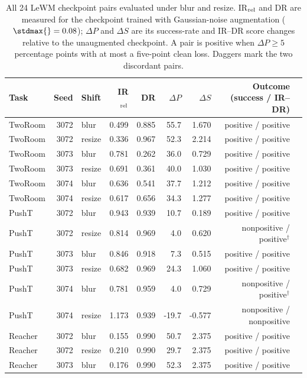 \begin{table}[t]
\centering
\caption{All 24 LeWM checkpoint pairs evaluated under blur and resize. IR$_{\rm rel}$ and DR are measured for the checkpoint trained with Gaussian-noise augmentation ($\stdmax{}=0.08$); $\Delta P$ and $\Delta S$ are its success-rate and IR--DR score changes relative to the unaugmented checkpoint. A pair is positive when $\Delta P\geq5$ percentage points with at most a five-point clean loss. Daggers mark the two discordant pairs.}
\label{tab:cross-stressor-ir-dr-all-pairs}
\footnotesize
\setlength{\tabcolsep}{3pt}
\begin{tabular}{lrlrrrrrl}
\toprule
Task & Seed & Shift & IR$_{\rm rel}$ & DR & $\Delta P$ & $\Delta S$ & Outcome (success / IR--DR) \\
\midrule
TwoRoom & 3072 & blur & 0.499 & 0.885 & 55.7 & 1.670 & positive / positive \\
TwoRoom & 3072 & resize & 0.336 & 0.967 & 52.3 & 2.214 & positive / positive \\
TwoRoom & 3073 & blur & 0.781 & 0.262 & 36.0 & 0.729 & positive / positive \\
TwoRoom & 3073 & resize & 0.691 & 0.361 & 40.0 & 1.030 & positive / positive \\
TwoRoom & 3074 & blur & 0.636 & 0.541 & 37.7 & 1.212 & positive / positive \\
TwoRoom & 3074 & resize & 0.617 & 0.656 & 34.3 & 1.277 & positive / positive \\
PushT & 3072 & blur & 0.943 & 0.939 & 10.7 & 0.189 & positive / positive \\
PushT & 3072 & resize & 0.814 & 0.969 & 4.0 & 0.620 & nonpositive / positive$^\dag$ \\
PushT & 3073 & blur & 0.846 & 0.918 & 7.3 & 0.515 & positive / positive \\
PushT & 3073 & resize & 0.682 & 0.969 & 24.3 & 1.060 & positive / positive \\
PushT & 3074 & blur & 0.781 & 0.959 & 4.0 & 0.729 & nonpositive / positive$^\dag$ \\
PushT & 3074 & resize & 1.173 & 0.939 & -19.7 & -0.577 & nonpositive / nonpositive \\
Reacher & 3072 & blur & 0.155 & 0.990 & 50.7 & 2.375 & positive / positive \\
Reacher & 3072 & resize & 0.210 & 0.990 & 29.7 & 2.375 & positive / positive \\
Reacher & 3073 & blur & 0.176 & 0.990 & 52.3 & 2.375 & positive / positive \\

\end{tabular}
\end{table}
